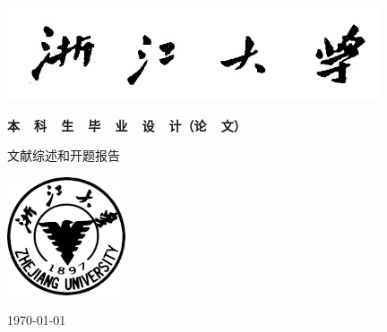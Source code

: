 \pagestyle{empty}

\begin{center}
	\vspace*{5ex}
	\includegraphics[width=11cm]{images/zju.jpg} 
		
	\vspace{1ex}
	\bfseries
	本\ \ 科\ \ 生\ \ 毕\ \ 业\ \ 设\ \ 计（论\ \ 文）
		
	\vspace{1ex}
	文献综述和开题报告
		
	\vspace{3ex}
	\includegraphics[width=3.5cm]{images/qsy.jpg}
	
	\cover	
	\vspace{5ex}
	\underline{\makebox[7cm]{\stuname\qquad \stuid}}
	
	\vspace{2ex}
	\underline{\makebox[7cm]{\teaname}}
	
	\vspace{2ex}
	\underline{\makebox[7cm]{\stugrade\stumajor}}
	
	\vspace{2ex}
	\underline{\makebox[7cm]{\stucollege}}
	
	\vspace{16ex}
	\today
\end{center}

